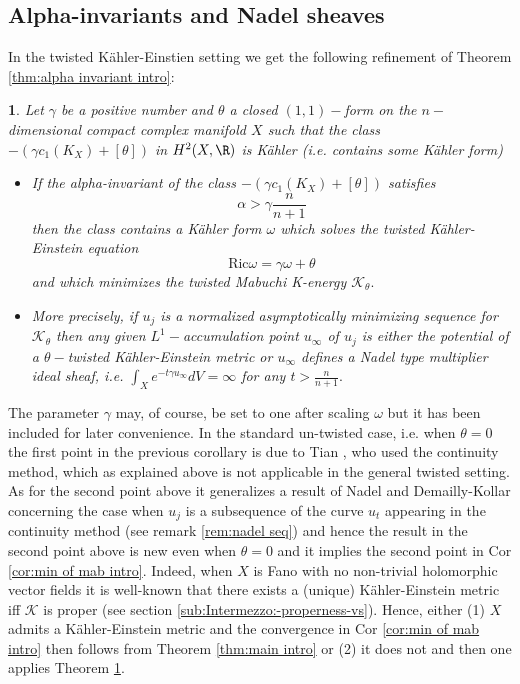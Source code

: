 \documentclass[11pt,oneside,english]{amsart}
\numberwithin{equation}{section}
\numberwithin{figure}{section}
\theoremstyle{plain}
\newtheorem{thm}{\protect\theoremname}[section]
\theoremstyle{plain}
\theoremstyle{plain}
\theoremstyle{plain}
\theoremstyle{remark}
\theoremstyle{definition}
\providecommand{\theoremname}{Theorem}
\begin{document}
\subsection{\label{sub:Proof-of-Corollary} Alpha-invariants and Nadel sheaves}

In the twisted Kähler-Einstien setting we get the following refinement
of Theorem \ref{thm:alpha invariant intro}: 
\begin{thm}
\label{cor:alpha inv for twisted}Let $\gamma$ be a positive number
and $\theta$ a closed $(1,1)-$form on the $n-$dimensional compact
complex manifold $X$ such that the class $-(\gamma c_{1}(K_{X})+[\theta])$
in $H^{2}(X,\R)$ is Kähler (i.e. contains some Kähler form) 
\begin{itemize}
\item If the alpha-invariant of the class \textup{$-(\gamma c_{1}(K_{X})+[\theta])$}
satisfies 
\[
\alpha>\gamma\frac{n}{n+1}
\]
 then the class contains a Kähler form $\omega$ which solves the
twisted Kähler-Einstein equation 
\begin{equation}
\mbox{Ric}\omega=\gamma\omega+\theta\label{eq:twisted k-e eq in thm}
\end{equation}
 and which minimizes the twisted Mabuchi K-energy $\mathcal{K}_{\theta}.$ 
\item More precisely, if $u_{j}$ is a normalized asymptotically minimizing
sequence for $\mathcal{K}_{\theta}$ then any given $L^{1}-$accumulation
point $u_{\infty}$ of $u_{j}$ is \emph{either} the potential of
a $\theta-$twisted Kähler-Einstein metric\emph{ or }$u_{\infty}$
defines a Nadel type multiplier ideal sheaf, i.e. $\int_{X}e^{-t\gamma u_{\infty}}dV=\infty$
for any $t>\frac{n}{n+1}.$ 
\end{itemize}
\end{thm}
The parameter $\gamma$ may, of course, be set to one after scaling
$\omega$ but it has been included for later convenience. In the standard
un-twisted case, i.e. when $\theta=0$ the first point in the previous
corollary is due to Tian \cite{ti1}, who used the continuity method,
which as explained above is not applicable in the general twisted
setting. As for the second point above it generalizes a result of
Nadel \cite{na} and Demailly-Kollar \cite{d-j} concerning the case
when $u_{j}$ is a subsequence of the curve $u_{t}$ appearing in
the continuity method (see remark \ref{rem:nadel seq}) and hence
the result in the second point above is new even when $\theta=0$
and it implies the second point in Cor \ref{cor:min of mab intro}.
Indeed, when $X$ is Fano with no non-trivial holomorphic vector fields
it is well-known that there exists a (unique) Kähler-Einstein metric
iff $\mathcal{K}$ is proper (see section \ref{sub:Intermezzo:-properness-vs}).
Hence, either (1) $X$ admits a Kähler-Einstein metric and the convergence
in Cor \ref{cor:min of mab intro} then follows from Theorem \ref{thm:main intro}
or (2) it does not and then one applies Theorem \ref{cor:alpha inv for twisted}.
\end{document}
